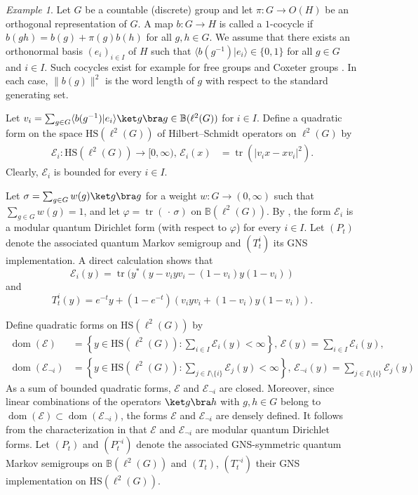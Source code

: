 \documentclass[12pt,a4paper]{amsart}
\newcommand{\1}{\mathds{1}}
\newcommand{\tr}{\operatorname{tr}}
\renewcommand{\phi}{\varphi}
\newcommand{\E}{\mathcal E}
\newcommand{\IB}{\mathbb B}
\newcommand{\dom}{\operatorname{dom}}
\newcommand{\abs}[1]{\lvert#1\rvert}
\newcommand{\norm}[1]{\lVert#1\rVert}
\theoremstyle{plain}
\theoremstyle{definition}
\theoremstyle{remark}
\newtheorem{example}[proposition]{Example}
\begin{document}
\begin{example}
    Let $G$ be a countable (discrete) group and let $\pi\colon G\to O(H)$ be an orthogonal representation of $G$. A map $b\colon G\to H$ is called a $1$-cocycle if $b(gh)=b(g)+\pi(g)b(h)$ for all $g,h\in G$. We assume that there exists an orthonormal basis $(e_i)_{i\in I}$ of $H$ such that $\langle b(g^{-1})|e_i\rangle\in \{0,1\}$ for all $g\in G$ and $i\in I$. Such cocycles exist for example for free groups \cite[Proof of Lemma 1.2]{Haa79} and Coxeter groups \cite[Section 7.3]{Boz87}. In each case, $\norm{b(g)}^2$ is the word length of $g$ with respect to the standard generating set.

    Let $v_i=\sum_{g\in G}\langle b(g^{-1})|e_i\rangle\ket g\bra g\in \IB(\ell^2(G))$ for $i\in I$.  Define a quadratic form on the space $\mathrm{HS}(\ell^2(G))$ of Hilbert--Schmidt operators on $\ell^2(G)$ by
    \begin{align*}
        \E_i\colon \mathrm{HS}(\ell^2(G))\to [0,\infty),\,\E_i(x)&=\tr(\abs{v_i x-xv_i}^2).
    \end{align*}
    Clearly, $\E_i$ is bounded for every $i\in I$.

    Let $\sigma=\sum_{g\in G}w(g)\ket g\bra g$ for a weight $w\colon G\to (0,\infty)$ such that $\sum_{g\in G}w(g)=1$, and let $\phi=\tr(\,\cdot\,\sigma)$ on $\IB(\ell^2(G))$. By \cite[Example 5.1]{Wir24}, the form $\E_i$ is a modular quantum Dirichlet form (with respect to $\phi$) for every $i\in I$. Let $(P_t)$ denote the associated quantum Markov semigroup and $(T_t^i)$ its GNS implementation. A direct calculation shows that
    \begin{equation*}
        \E_i(y)=\tr(y^\ast(y-v_i y v_i-(1-v_i)y(1-v_i))
    \end{equation*}
    and
    \begin{equation*}
        T_t^i(y)=e^{-t}y+(1-e^{-t})(v_iy v_i+(1-v_i)y(1-v_i)).
    \end{equation*}

    Define quadratic forms on $\mathrm{HS}(\ell^2(G))$ by
    \begin{align*}
        \dom(\E)&=\left\{y\in \mathrm{HS}(\ell^2(G)): \sum_{i\in I}\E_i(y)<\infty\right\},\,\E(y)=\sum_{i\in I}\E_i(y),\\
        \dom(\E_{\neg i})&=\left\{y\in \mathrm{HS}(\ell^2(G)):\sum_{j\in I\setminus\{i\}}\E_j(y)<\infty \right\},\,\E_{\neg i}(y)=\sum_{j\in I\setminus\{i\}}\E_j(y)
    \end{align*}
    As a sum of bounded quadratic forms, $\E$ and $\E_{\neg i}$ are closed. Moreover, since linear combinations of the operators $\ket g\bra h$ with $g,h\in G$ belong to $\dom(\E)\subset \dom(\E_{\neg i})$, the forms $\E$ and $\E_{\neg i}$ are densely defined. It follows from the characterization in \cite[Theorem 4.11]{Cip97} that $\E$ and $\E_{\neg i}$ are  modular quantum Dirichlet forms. Let $(P_t)$ and $(P_t^{\neg i})$ denote the associated GNS-symmetric quantum Markov semigroups on $\IB(\ell^2(G))$ and $(T_t)$, $(T_t^{\neg i})$ their GNS implementation on $\mathrm{HS}(\ell^2(G))$.


\end{example}
\end{document}
